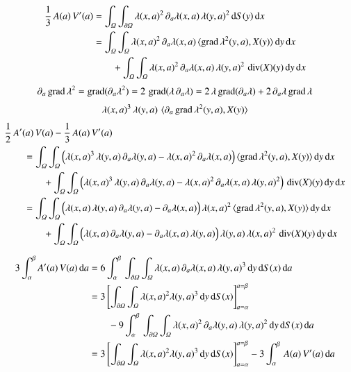 \begin{align*}
	\frac{1}{3} \, A(a) \, V'(a)
	&=
	\int_\varOmega \int_{\partial\varOmega}
		\lambda(x,a)^2 \, \partial_a\lambda(x,a) \, \lambda(y,a)^2
	\, {\operatorname{d}} S(y) \, {\operatorname{d}} x
	\\
	&=
	\int_\varOmega \int_{\varOmega}
		\lambda(x,a)^2 \, \partial_a\lambda(x,a) \, \langle  \operatorname{grad} \lambda^2 (y,a) , X(y)  \rangle
	\, {\operatorname{d}} y \, {\operatorname{d}} x		
	\\
	&\qquad
	+
	\int_\varOmega \int_{\varOmega}
		\lambda(x,a)^2 \, \partial_a\lambda(x,a) \, \lambda(y,a)^2
	\, \operatorname{div}(X)(y)
	\, {\operatorname{d}} y \, {\operatorname{d}} x
\end{align*}
\begin{align*}
	\partial_a \operatorname{grad} \lambda^2
	=
	\operatorname{grad} (\partial_a\lambda^2)
	=
	2 \, \operatorname{grad} (\lambda \, \partial_a\lambda)
	=
	2 \, \lambda  \operatorname{grad}( \partial_a\lambda)
	+
	2 \, \partial_a\lambda  \operatorname{grad} \lambda
\end{align*}
\begin{align*}
	\lambda(x,a)^3 \,  \lambda(y,a) \, 
	\, \langle  \partial_a \operatorname{grad} \lambda^2 (y,a) , X(y)  \rangle
\end{align*}
\begin{align*}
	\MoveEqLeft
	\frac{1}{2}\, A'(a) \, V(a) - \frac{1}{3} \, A(a) \, V'(a)
	\\
	&=
	\int_\varOmega \int_{\varOmega}
	\Bigparen{
		\lambda(x,a)^3 \, \lambda(y,a) \, \pd_a\lambda(y,a)
		-
		\lambda(x,a)^2 \, \pd_a\lambda(x,a) 
	}		
	\, \ninnerprod{ \grad \lambda^2 (y,a) , X(y) }
	\, \dd y \, \dd x		
	\\
	&\qquad
	+
	\int_\varOmega \int_{\varOmega}
	\Bigparen{	
		\lambda(x,a)^3 \,  \lambda(y,a) \, \pd_a\lambda(y,a) 
		-
		\lambda(x,a)^2 \, \pd_a\lambda(x,a) \, \lambda(y,a)^2
	}
	\, \diver(X)(y)
	\, \dd y \, \dd x
	\\
	&=
	\int_\varOmega \int_{\varOmega}
	\Bigparen{
		\lambda(x,a) \, \lambda(y,a) \, \pd_a\lambda(y,a)
		-
		\pd_a\lambda(x,a) 
	}		
	\, \lambda(x,a)^2 \,  \ninnerprod{ \grad \lambda^2 (y,a) , X(y) }
	\, \dd y \, \dd x		
	\\
	&\qquad
	+
	\int_\varOmega \int_{\varOmega}
	\Bigparen{	
		\lambda(x,a) \, \pd_a\lambda(y,a) 
		-
		\pd_a\lambda(x,a) \, \lambda(y,a)
	}
	\, \lambda(y,a) \, \lambda(x,a)^2
	\, \diver(X)(y)
	\, \dd y \, \dd x	
\end{align*}

	\newpage
\begin{align*}
	3 \int_\alpha^\beta A'(a) \, V(a) \, {\operatorname{d}} a
	&=
	6  \int_\alpha^\beta\, \int_{\partial \varOmega} \int_\varOmega
		\lambda(x,a) \, \partial_a\lambda(x,a) \,
		\lambda(y,a)^3
	\, {\operatorname{d}} y \, {\operatorname{d}} S(x) \, {\operatorname{d}} a
	\\
	&=
	3\left[
	\int_{\partial \varOmega} \int_\varOmega
		\lambda(x,a)^2
		\lambda(y,a)^3
	\, {\operatorname{d}} y \, {\operatorname{d}} S(x)
	\right]_{a= \alpha}^{a = \beta}
	\\
	&\qquad
	-
	9  \int_\alpha^\beta\, \int_{\partial \varOmega} \int_\varOmega
		\lambda(x,a)^2   \,
		\partial_a\lambda(y,a) \, \lambda(y,a)^2
	\, {\operatorname{d}} y \, {\operatorname{d}} S(x) \, {\operatorname{d}} a	
	\\
	&=
	3\left[
	\int_{\partial \varOmega} \int_\varOmega
		\lambda(x,a)^2
		\lambda(y,a)^3
	\, {\operatorname{d}} y \, {\operatorname{d}} S(x)
	\right]_{a= \alpha}^{a = \beta}
	-
	3 
	\int_\alpha^\beta\, A(a) \, V'(a) \, {\operatorname{d}} a		
\end{align*}

